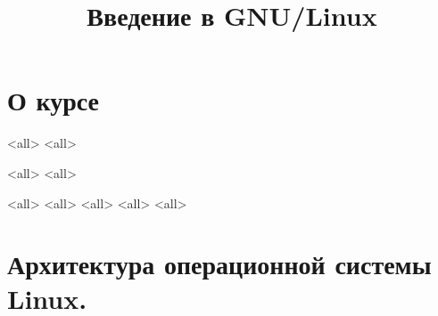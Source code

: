 

\title{Введение в GNU/Linux}




\begin{frame}
	\frametitle{}
	\titlepage
	\vspace{-0.5cm}
	\begin{center}
	\end{center}
\end{frame}


\begin{frame}
	\tableofcontents
	[hideallsubsections]
\end{frame}


\section{О курсе}

\mode<all>{}
\mode<all>{}

\mode<all>{}
\mode<all>{}

\mode<all>{}
\mode<all>{}
\mode<all>{}
\mode<all>{}
\mode<all>{}

\section{Архитектура операционной системы Linux. }

